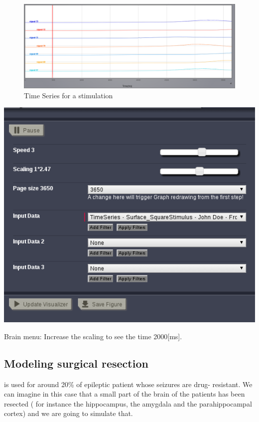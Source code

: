 \documentclass{tufte-handout}
\begin{document}
\begin{figure}[h]
  \includegraphics[width=\linewidth]{Handout_UI_ModellingAnEpilepticPatient_StimulationTimeSeries}%
  \caption{Time Series for a stimulation}%
  \label{fig:stim_ts}%
\end{figure}

\begin{marginfigure}
  \includegraphics[width=\linewidth]{Handout_UI_ModellingAnEpilepticPatient_BrainMenuStimulation}%
  \caption{Brain menu: Increase the scaling to see the time \unit{2000}[ms].}%
  \label{fig:bm_stim}%
\end{marginfigure}


\subsection{Modeling surgical resection}

is used for around 20\% of epileptic patient whose seizures are drug-
resistant. We can imagine in this case that a small part of the brain of the
patients  has been resected ( for instance the hippocampus, the amygdala and
the parahippocampal cortex) and  we are going to simulate that.
\end{document}
